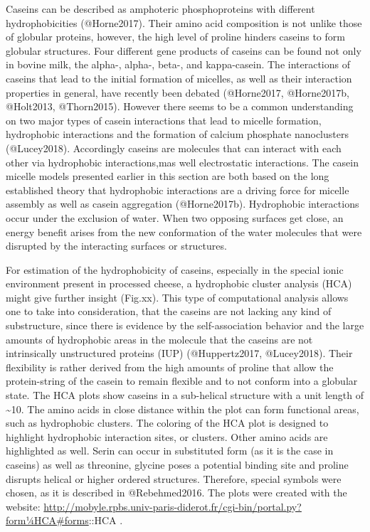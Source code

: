 \documentclass[
]{article}
\begin{document}
Caseins can be described as amphoteric phosphoproteins with different
hydrophobicities (@Horne2017). Their amino acid composition is not
unlike those of globular proteins, however, the high level of proline
hinders caseins to form globular structures. Four different gene
products of caseins can be found not only in bovine milk, the alpha-,
alpha-, beta-, and kappa-casein. The interactions of caseins that lead
to the initial formation of micelles, as well as their interaction
properties in general, have recently been debated (@Horne2017,
@Horne2017b, @Holt2013, @Thorn2015). However there seems to be a common
understanding on two major types of casein interactions that lead to
micelle formation, hydrophobic interactions and the formation of calcium
phosphate nanoclusters (@Lucey2018). Accordingly caseins are molecules
that can interact with each other via hydrophobic interactions,mas well
electrostatic interactions. The casein micelle models presented earlier
in this section are both based on the long established theory that
hydrophobic interactions are a driving force for micelle assembly as
well as casein aggregation (@Horne2017b). Hydrophobic interactions occur
under the exclusion of water. When two opposing surfaces get close, an
energy benefit arises from the new conformation of the water molecules
that were disrupted by the interacting surfaces or structures.

For estimation of the hydrophobicity of caseins, especially in the
special ionic environment present in processed cheese, a hydrophobic
cluster analysis (HCA) might give further insight (Fig.xx). This type of
computational analysis allows one to take into consideration, that the
caseins are not lacking any kind of substructure, since there is
evidence by the self-association behavior and the large amounts of
hydrophobic areas in the molecule that the caseins are not intrinsically
unstructured proteins (IUP) (@Huppertz2017, @Lucey2018). Their
flexibility is rather derived from the high amounts of proline that
allow the protein-string of the casein to remain flexible and to not
conform into a globular state. The HCA plots show caseins in a
sub-helical structure with a unit length of \textasciitilde10. The amino
acids in close distance within the plot can form functional areas, such
as hydrophobic clusters. The coloring of the HCA plot is designed to
highlight hydrophobic interaction sites, or clusters. Other amino acids
are highlighted as well. Serin can occur in substituted form (as it is
the case in caseins) as well as threonine, glycine poses a potential
binding site and proline disrupts helical or higher ordered structures.
Therefore, special symbols were chosen, as it is described in
@Rebehmed2016. The plots were created with the website:
\url{http://mobyle.rpbs.univ-paris-diderot.fr/cgi-bin/portal.py?form¼HCA\#forms}::HCA
.
\end{document}
